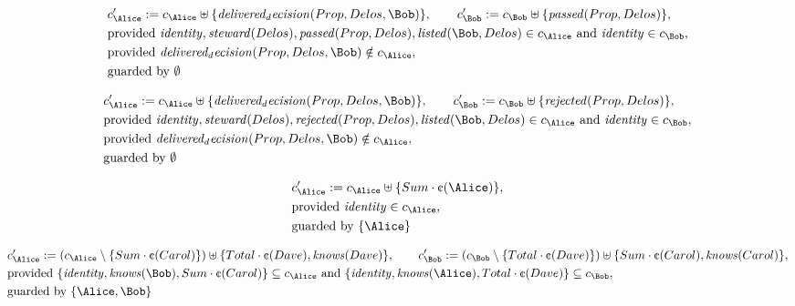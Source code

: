 \begin{align*}
&
c'_
{
\Alice
}
 := 
c_
{
\Alice
}
 \uplus 
\{
\mathit{
delivered_decision
}
(
Prop
,
Delos
,
\Bob
)
\}
, \qquad 
c'_
{
\Bob
}
 := 
c_
{
\Bob
}
 \uplus 
\{
\mathit{
passed
}
(
Prop
,
Delos
)
\}
,\\
&
\text{provided } 
\mathit{
identity
}
,
\mathit{
steward
}
(
Delos
)
,
\mathit{
passed
}
(
Prop
,
Delos
)
,
\mathit{
listed
}
(
\Bob
,
Delos
)
 \in c_
{
\Alice
}
 \text{ and } 
\mathit{
identity
}
 \in c_
{
\Bob
}
,\\
&
\text{provided } 
\mathit{
delivered_decision
}
(
Prop
,
Delos
,
\Bob
)
 \notin c_
{
\Alice
}
,\\
&
\text{guarded by } \emptyset
\end{align*}

\begin{align*}
&
c'_
{
\Alice
}
 := 
c_
{
\Alice
}
 \uplus 
\{
\mathit{
delivered_decision
}
(
Prop
,
Delos
,
\Bob
)
\}
, \qquad 
c'_
{
\Bob
}
 := 
c_
{
\Bob
}
 \uplus 
\{
\mathit{
rejected
}
(
Prop
,
Delos
)
\}
,\\
&
\text{provided } 
\mathit{
identity
}
,
\mathit{
steward
}
(
Delos
)
,
\mathit{
rejected
}
(
Prop
,
Delos
)
,
\mathit{
listed
}
(
\Bob
,
Delos
)
 \in c_
{
\Alice
}
 \text{ and } 
\mathit{
identity
}
 \in c_
{
\Bob
}
,\\
&
\text{provided } 
\mathit{
delivered_decision
}
(
Prop
,
Delos
,
\Bob
)
 \notin c_
{
\Alice
}
,\\
&
\text{guarded by } \emptyset
\end{align*}

\begin{align*}
&
c'_
{
\Alice
}
 := 
c_
{
\Alice
}
 \uplus 
\{
Sum
\cdot
\text{\textcent}
(
\Alice
)
\}
,\\
&
\text{provided } 
\mathit{
identity
}
 \in c_
{
\Alice
}
,\\
&
\text{guarded by } \{
\Alice
\}
\end{align*}

\begin{align*}
&
c'_
{
\Alice
}
 := 
(c_
{
\Alice
}
 \setminus 
\{
Sum
\cdot
\text{\textcent}
(
Carol
)
\}
) \uplus 
\{
Total
\cdot
\text{\textcent}
(
Dave
)
,
\mathit{
knows
}
(
Dave
)
\}
, \qquad 
c'_
{
\Bob
}
 := 
(c_
{
\Bob
}
 \setminus 
\{
Total
\cdot
\text{\textcent}
(
Dave
)
\}
) \uplus 
\{
Sum
\cdot
\text{\textcent}
(
Carol
)
,
\mathit{
knows
}
(
Carol
)
\}
,\\
&
\text{provided } 
\{
\mathit{
identity
}
,
\mathit{
knows
}
(
\Bob
)
,
Sum
\cdot
\text{\textcent}
(
Carol
)
\}
 \subseteq c_
{
\Alice
}
 \text{ and } 
\{
\mathit{
identity
}
,
\mathit{
knows
}
(
\Alice
)
,
Total
\cdot
\text{\textcent}
(
Dave
)
\}
 \subseteq c_
{
\Bob
}
,\\
&
\text{guarded by } \{
\Alice
,
\Bob
\}
\end{align*}
